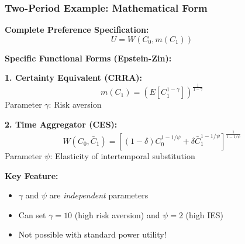 \documentclass{beamer}
\begin{document}
\begin{frame}
    \frametitle{Two-Period Example: Mathematical Form}
    
    \textbf{Complete Preference Specification:}
    \begin{equation*}
        U = W(C_0, m(C_1))
    \end{equation*}
    
    
    \textbf{Specific Functional Forms (Epstein-Zin):}
    
    
    \textbf{1. Certainty Equivalent (CRRA):}
    \begin{equation*}
        m(C_1) = \left( E[C_1^{1-\gamma}] \right)^{\frac{1}{1-\gamma}}
    \end{equation*}
    Parameter $\gamma$: Risk aversion
    
    
    \textbf{2. Time Aggregator (CES):}
    \begin{equation*}
        W(C_0, \bar{C}_1) = \left[ (1-\delta)C_0^{1-1/\psi} + \delta \bar{C}_1^{1-1/\psi} \right]^{\frac{1}{1-1/\psi}}
    \end{equation*}
    Parameter $\psi$: Elasticity of intertemporal substitution
    
    
    \textbf{Key Feature:}
    \begin{itemize}
        \item $\gamma$ and $\psi$ are \textit{independent} parameters
        \item Can set $\gamma = 10$ (high risk aversion) and $\psi = 2$ (high IES)
        \item Not possible with standard power utility!
    \end{itemize}
    
\end{frame}
\end{document}

